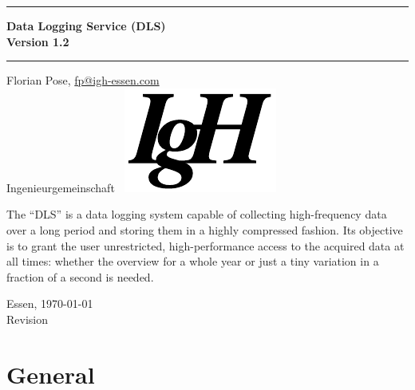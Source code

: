 \documentclass[a4paper,12pt,BCOR6mm,bibtotoc,idxtotoc]{scrbook}
\newcommand{\IgH}{\raisebox{-0.7667ex}\
    {\includegraphics[height=2.2ex]{bilder/ighsign}}}
\begin{document}


 \pagestyle{empty}

\begin{titlepage} \begin{center} \rule{\textwidth}{1.5mm}

{\Huge\bf Data Logging Service (DLS)\\[1ex] Version 1.2}

\vspace{1ex}

\rule{\textwidth}{1.5mm}

\vspace{\fill}

{\Large Florian Pose, \url{fp@igh-essen.com}\\[1ex]
    Ingenieurgemeinschaft \IgH}

\vspace{\fill}

The ``DLS'' is a data logging system capable of collecting high-frequency data
over a long period and storing them in a highly compressed fashion. Its
objective is to grant the user unrestricted, high-performance access to the
acquired data at all times: whether the overview for a whole year or just a
tiny variation in a fraction of a second is needed.

\vspace{\fill}

{\large Essen, \today\\[1ex] Revision \revision}

\end{center}
\end{titlepage}



\pagestyle{scrheadings}

\tableofcontents



\chapter{General}
\label{sec:allg}
\end{document}

